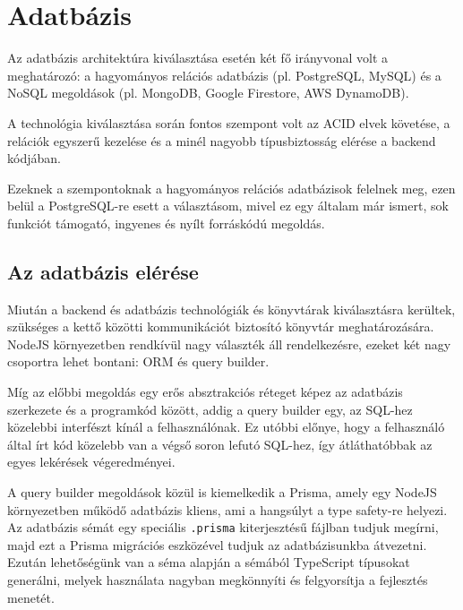 \section{Adatbázis}
Az adatbázis architektúra kiválasztása esetén két fő irányvonal volt a meghatározó: a hagyományos relációs adatbázis (pl. PostgreSQL, MySQL) és a NoSQL megoldások (pl. MongoDB, Google Firestore, AWS DynamoDB).

A technológia kiválasztása során fontos szempont volt az ACID elvek követése, a relációk egyszerű kezelése és a minél nagyobb típusbiztosság elérése a backend kódjában.

Ezeknek a szempontoknak a hagyományos relációs adatbázisok felelnek meg, ezen belül a PostgreSQL-re esett a választásom, mivel ez egy általam már ismert, sok funkciót támogató, ingyenes és nyílt forráskódú megoldás. \cite{Postgresql}

\subsection{Az adatbázis elérése}
Miután a backend és adatbázis technológiák és könyvtárak kiválasztásra kerültek, szükséges a kettő közötti kommunikációt biztosító könyvtár meghatározására.
NodeJS környezetben rendkívül nagy választék áll rendelkezésre, ezeket két nagy csoportra lehet bontani: ORM és query builder.

Míg az előbbi megoldás egy erős absztrakciós réteget képez az adatbázis szerkezete és a programkód között, addig a query builder egy, az SQL-hez közelebbi interfészt kínál a felhasználónak.
Ez utóbbi előnye, hogy a felhasználó által írt kód közelebb van a végső soron lefutó SQL-hez, így átláthatóbbak az egyes lekérések végeredményei.

A query builder megoldások közül is kiemelkedik a Prisma, amely egy NodeJS környezetben működő adatbázis kliens, ami a hangsúlyt a type safety-re helyezi.
Az adatbázis sémát egy speciális \lstinline|.prisma| kiterjesztésű fájlban tudjuk megírni, majd ezt a Prisma migrációs eszközével tudjuk az adatbázisunkba átvezetni.
Ezután lehetőségünk van a séma alapján a sémából TypeScript típusokat generálni, melyek használata nagyban megkönnyíti és felgyorsítja a fejlesztés menetét.

